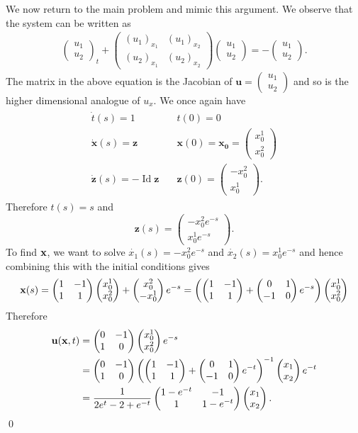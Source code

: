 We now return to the main problem and mimic this argument. We observe that the system can be written as
\begin{align*}
\begin{pmatrix}
u_{1}\\u_{2}
\end{pmatrix}_{t} +
\begin{pmatrix}
(u_{1})_{x_{1}} & (u_{1})_{x_{2}}\\
(u_{2})_{x_{1}} & (u_{2})_{x_{2}}
\end{pmatrix}
\begin{pmatrix}
u_{1}\\ u_{2}
\end{pmatrix} =
-\begin{pmatrix}
u_{1}\\u_{2}
\end{pmatrix}.
\end{align*}
The matrix in the above equation is the Jacobian of $\mathbf{u} = (\begin{smallmatrix}u_{1}\\u_{2}\end{smallmatrix})$ and so is the higher dimensional
analogue of $u_{x}$. We once again have
\begin{align*}
\begin{array}{ll}
\dot{t}(s) = 1 \quad & t(0) = 0\\
\dot{\mathbf{x}}(s) = \mathbf{z} \quad & \mathbf{x}(0) = \mathbf{x_{0}} = \begin{pmatrix}x_{0}^{1}\\x_{0}^{2}\end{pmatrix}\\
\dot{\mathbf{z}}(s) = -\operatorname{Id} \mathbf{z} \quad & \mathbf{z}(0) = \begin{pmatrix}-x_{0}^{2}\\x_{0}^{1}\end{pmatrix}.
\end{array}
\end{align*}
Therefore $t(s) = s$ and
$$\mathbf{z}(s) = \begin{pmatrix} -x_{0}^{2}e^{-s}\\x_{0}^{1}e^{-s}\end{pmatrix}.$$
To find $\mathbf{x}$, we want to solve $\dot{x_{1}}(s) = -x_{0}^{2}e^{-s}$ and $\dot{x_{2}}(s) = x_{0}^{1}e^{-s}$ and hence combining this with the initial conditions
gives
\begin{align*}
\mathbf{x}(s) = \begin{pmatrix} 1 & -1 \\ 1 & 1\end{pmatrix}\begin{pmatrix} x_{0}^{1} \\ x_{0}^{2}\end{pmatrix} + \begin{pmatrix} x_{0}^{2} \\ -x_{0}^{1}\end{pmatrix}e^{-s} = \left(\begin{pmatrix} 1 & -1 \\ 1 & 1\end{pmatrix} + \begin{pmatrix} 0 & 1 \\ -1 & 0\end{pmatrix}e^{-s}\right)\begin{pmatrix} x_{0}^{1} \\ x_{0}^{2}\end{pmatrix}
\end{align*}
Therefore
\begin{align*}
\mathbf{u}(\mathbf{x}, t) &= \begin{pmatrix} 0 & -1 \\ 1 & 0\end{pmatrix}\begin{pmatrix} x_{0}^{1} \\ x_{0}^{2}\end{pmatrix}e^{-s}\\
& = \begin{pmatrix} 0 & -1 \\ 1 & 0\end{pmatrix}\left(\begin{pmatrix} 1 & -1 \\ 1 & 1\end{pmatrix} + \begin{pmatrix} 0 & 1 \\ -1 & 0\end{pmatrix}e^{-t}\right)^{-1}\begin{pmatrix} x_{1} \\ x_{2}\end{pmatrix}e^{-t}\\
& = \frac{1}{2e^{t} - 2 + e^{-t}}\begin{pmatrix} 1 - e^{-t} & -1 \\ 1 & 1 - e^{-t}\end{pmatrix}\begin{pmatrix} x_{1} \\ x_{2}\end{pmatrix}.
\end{align*}
\hfill\qed

